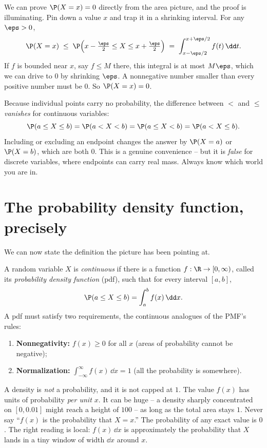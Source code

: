 We can prove $\P(X=x)=0$ directly from the area picture, and the proof is
illuminating. Pin down a value $x$ and trap it in a shrinking interval. For any
$\eps > 0$,
\[
  \P(X = x) \;\le\; \P\!\left(x - \tfrac{\eps}{2} \le X \le x + \tfrac{\eps}{2}\right)
  \;=\; \int_{x-\eps/2}^{x+\eps/2} f(t)\,\dd t .
\]
If $f$ is bounded near $x$, say $f \le M$ there, this integral is at most $M\eps$,
which we can drive to $0$ by shrinking $\eps$. A nonnegative number smaller than
every positive number must be $0$. So $\P(X=x)=0$.

\begin{trapbox}
Because individual points carry no probability, the difference between $<$ and
$\le$ \emph{vanishes} for continuous variables:
\[
  \P(a \le X \le b) = \P(a < X < b) = \P(a \le X < b) = \P(a < X \le b).
\]
Including or excluding an endpoint changes the answer by $\P(X=a)$ or $\P(X=b)$,
which are both $0$. This is a genuine convenience -- but it is \emph{false} for
discrete variables, where endpoints can carry real mass. Always know which world
you are in.
\end{trapbox}

\section{The probability density function, precisely}
\label{ch10:pdf-def}

We can now state the definition the picture has been pointing at.

\begin{definition}
\label{ch10:def-pdf}
A random variable $X$ is \emph{continuous} if there is a function
$f:\R \to [0,\infty)$, called its \emph{probability density function} (pdf), such
that for every interval $[a,b]$,
\[
  \P(a \le X \le b) = \int_a^b f(x)\,\dd x .
\]
A pdf must satisfy two requirements, the continuous analogues of the PMF's rules:
\begin{enumerate}
\item \textbf{Nonnegativity:} $f(x) \ge 0$ for all $x$ (areas of probability cannot
      be negative);
\item \textbf{Normalization:} $\displaystyle \int_{-\infty}^{\infty} f(x)\,\dd x = 1$
      (all the probability is somewhere).
\end{enumerate}
\end{definition}

\begin{trapbox}
A density is \emph{not} a probability, and it is not capped at $1$. The value
$f(x)$ has units of probability \emph{per unit $x$}. It can be huge -- a density
sharply concentrated on $[0,0.01]$ might reach a height of $100$ -- as long as the
total area stays $1$. Never say ``$f(x)$ is the probability that $X=x$.'' The
probability of any exact value is $0$. The right reading is local: $f(x)\,\dd x$ is
approximately the probability that $X$ lands in a tiny window of width $\dd x$
around $x$.
\end{trapbox}

